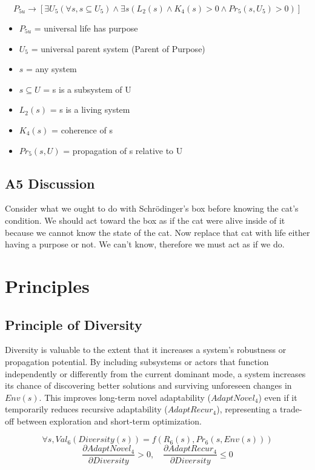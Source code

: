 \documentclass[11pt]{article}
\begin{document}
\[
P_{5u} \rightarrow [\exists U_5(\forall s, s \subseteq U_5) \land \exists s(L_2(s) \land K_4(s) > 0 \land Pr_5(s, U_5) > 0)]
\]
\begin{itemize}
\item $P_{5u}$ = universal life has purpose
\item $U_5$ = universal parent system (Parent of Purpose)
\item $s$ = any system
\item $s \subseteq U$ = s is a subsystem of U
\item $L_2(s)$ = s is a living system
\item $K_4(s)$ = coherence of s
\item $Pr_5(s, U)$ = propagation of s relative to U
\end{itemize}

\subsection*{A5 Discussion}
Consider what we ought to do with Schrödinger’s box before knowing the cat’s condition. We should act toward the box as if the cat were alive inside of it because we cannot know the state of the cat. Now replace that cat with life either having a purpose or not. We can’t know, therefore we must act as if we do.

\section*{Principles}

\subsection*{Principle of Diversity}
Diversity is valuable to the extent that it increases a system’s robustness or propagation potential. By including subsystems or actors that function independently or differently from the current dominant mode, a system increases its chance of discovering better solutions and surviving unforeseen changes in $Env(s)$. This improves long-term novel adaptability ($AdaptNovel_4$) even if it temporarily reduces recursive adaptability ($AdaptRecur_4$), representing a trade-off between exploration and short-term optimization.

\[
\forall s, Val_6(Diversity(s)) = f(R_6(s), Pr_6(s, Env(s)))
\]
\[
\frac{\partial AdaptNovel_4}{\partial Diversity} > 0, \quad \frac{\partial AdaptRecur_4}{\partial Diversity} \le 0
\]
\end{document}
